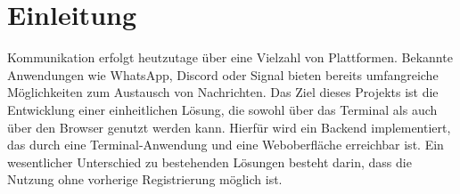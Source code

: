 \chapter{Einleitung}

Kommunikation erfolgt heutzutage über eine Vielzahl von Plattformen. Bekannte Anwendungen wie WhatsApp, Discord oder Signal bieten bereits umfangreiche Möglichkeiten zum Austausch von Nachrichten.
Das Ziel dieses Projekts ist die Entwicklung einer einheitlichen Lösung, die sowohl über das Terminal als auch über den Browser genutzt werden kann. Hierfür wird ein Backend implementiert, das durch eine Terminal-Anwendung und eine Weboberfläche erreichbar ist.
Ein wesentlicher Unterschied zu bestehenden Lösungen besteht darin, dass die Nutzung ohne vorherige Registrierung möglich ist.
